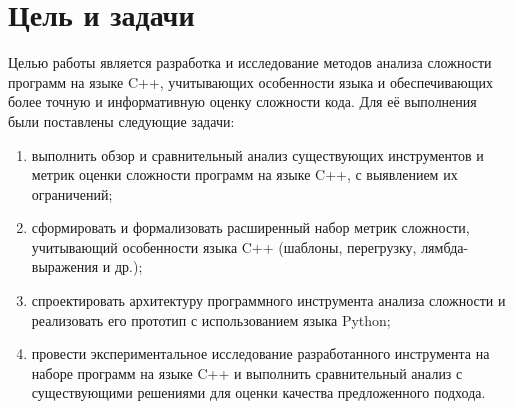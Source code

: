 \documentclass[12pt,a4paper]{article}
\begin{document}
\section*{Цель и задачи}

Целью работы является разработка и исследование методов анализа сложности программ на языке C++, учитывающих особенности языка и обеспечивающих более точную и информативную оценку сложности кода. 
Для её выполнения были поставлены следующие задачи:

\begin{enumerate}
    \item выполнить обзор и сравнительный анализ существующих инструментов и метрик оценки сложности программ на языке C++, с выявлением их ограничений;
    \item сформировать и формализовать расширенный набор метрик сложности, учитывающий особенности языка C++ (шаблоны, перегрузку, лямбда-выражения и др.);
    \item спроектировать архитектуру программного инструмента анализа сложности и реализовать его прототип с использованием языка Python;
    \item провести экспериментальное исследование разработанного инструмента на наборе программ на языке C++ и выполнить сравнительный анализ с существующими решениями для оценки качества предложенного подхода.
\end{enumerate}
\end{document}
